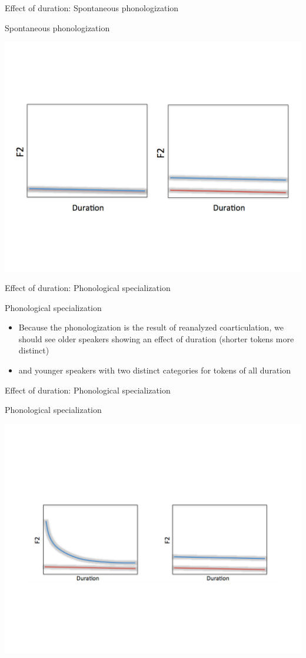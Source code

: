 \documentclass[hyperref={pdfpagelabels=false}]{beamer}
\begin{document}
\begin{frame}[noframenumbering]{Effect of duration: Spontaneous phonologization}
	\begin{block}{Spontaneous phonologization}
	\begin{center}
	\includegraphics[trim=2cm 2cm 2cm 2cm, clip=false, width=.7\textwidth]{spontdurex.pdf}
	\end{center}
	\end{block}	
\end{frame}

\begin{frame}[noframenumbering]{Effect of duration: Phonological specialization}
	\begin{block}{Phonological specialization}
		\begin{itemize}
			\item Because the phonologization is the result of reanalyzed coarticulation, we should see older speakers showing an effect of duration (shorter tokens more distinct) \pause
			\item and younger speakers with two distinct categories for tokens of all duration
		\end{itemize}
	\end{block}	
\end{frame}

\begin{frame}[noframenumbering]{Effect of duration: Phonological specialization}
	\begin{block}{Phonological specialization}
	\begin{center}
	\includegraphics[trim=2cm 2cm 2cm 2cm, clip=false, width=.7\textwidth]{DurationEx.pdf}
	\end{center}
	\end{block}	
\end{frame}
\end{document}

